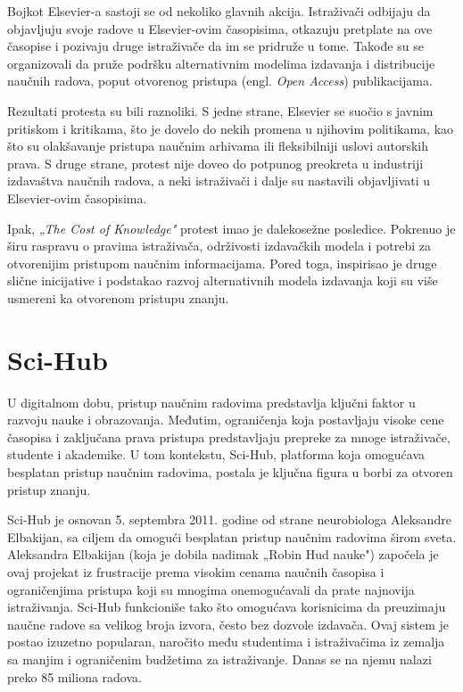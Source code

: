 \documentclass{article}
\begin{document}
Bojkot Elsevier-a sastoji se od nekoliko glavnih akcija. Istraživači odbijaju da objavljuju svoje radove u Elsevier-ovim časopisima, otkazuju pretplate na ove časopise i pozivaju druge istraživače da im se pridruže u tome\cite{an2024cost}. Takođe su se organizovali da pruže podršku alternativnim modelima izdavanja i distribucije naučnih radova, poput otvorenog pristupa (engl. \textit{Open Access}) publikacijama.

Rezultati protesta su bili raznoliki. S jedne strane, Elsevier se suočio s javnim pritiskom i kritikama, što je dovelo do nekih promena u njihovim politikama, kao što su olakšavanje pristupa naučnim arhivama ili fleksibilniji uslovi autorskih prava. S druge strane, protest nije doveo do potpunog preokreta u industriji izdavaštva naučnih radova, a neki istraživači i dalje su nastavili objavljivati u Elsevier-ovim časopisima.

Ipak, \textit{„The Cost of Knowledge"} protest imao je dalekosežne posledice. Pokrenuo je širu raspravu o pravima istraživača, održivosti izdavačkih modela i potrebi za otvorenijim pristupom naučnim informacijama. Pored toga, inspirisao je druge slične inicijative i podstakao razvoj alternativnih modela izdavanja koji su više usmereni ka otvorenom pristupu znanju.


\section{Sci-Hub}

U digitalnom dobu, pristup naučnim radovima predstavlja ključni faktor u razvoju nauke i obrazovanja. Međutim, ograničenja koja postavljaju visoke cene časopisa i zaključana prava pristupa predstavljaju prepreke za mnoge istraživače, studente i akademike. U tom kontekstu, Sci-Hub, platforma koja omogućava besplatan pristup naučnim radovima, postala je ključna figura u borbi za otvoren pristup znanju\cite{himmelstein2018research}.

Sci-Hub je osnovan 5. septembra 2011. godine od strane neurobiologa Aleksandre Elbakijan, sa ciljem da omogući besplatan pristup naučnim radovima širom sveta\cite{pastor2023scihub}. Aleksandra Elbakijan (koja je dobila nadimak „Robin Hud nauke") započela je ovaj projekat iz frustracije prema visokim cenama naučnih časopisa i ograničenjima pristupa koji su mnogima onemogućavali da prate najnovija istraživanja. Sci-Hub funkcioniše tako što omogućava korisnicima da preuzimaju naučne radove sa velikog broja izvora, često bez dozvole izdavača. Ovaj sistem je postao izuzetno popularan, naročito među studentima i istraživačima iz zemalja sa manjim i ograničenim budžetima za istraživanje. Danas se na njemu nalazi preko 85 miliona radova\cite{scihubabout}.
\end{document}

